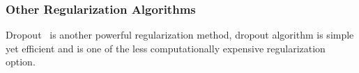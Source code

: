 \subsubsection{Other Regularization Algorithms }

Dropout~\cite{JMLR:v15:srivastava14a} is another powerful regularization method, dropout algorithm is simple yet efficient and is one of the less computationally expensive regularization option. 